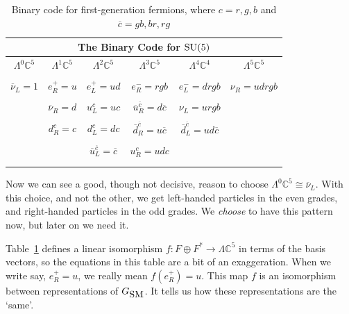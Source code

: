 \documentclass[12pt]{article}
\newcommand{\maps}{\colon}    %
\newcommand{\C}{{\mathbb C}}  %
\newcommand{\SU}{{\rm SU}}    %
\newcommand{\Ex}{\Lambda} %
\newcommand{\iso}{\cong} %
\newcommand{\GSM}{{G_{\mbox{\rm SM}}}}  %
\newcommand{\ubar}{\overline{u}} %
\newcommand{\dbar}{\overline{d}} %
\newcommand{\nubar}{\overline{\nu}} %
\newcommand{\cbar}{{\overline{c}}} %
\begin{document}
	\begin{table}[H]
\begin{center} 
	\begin{tabular}{cccccc} 
		\hline
		\multicolumn{6}{|c|}{\bf{The Binary Code for \boldmath $\SU(5)$}} \\
		\hline
		$\Ex^0 \C^5$   & $\Ex^1 \C^5$    & $\Ex^2 \C^5$            & $\Ex^3 \C^5$             & $\Ex^4 \C^4$              & $\Ex^5 \C^5$ \\ 
		\hline
\\
		$\nubar_L = 1$ & $e^+_R = u$     & $e^+_L = ud$            & $e^-_R = rgb$            & $e^-_L = drgb$            & $\nu_R = udrgb$ \\  \\
		               & $\nubar_R = d$  & $u^c_L = uc$            & $\ubar^\cbar_R = d\cbar$ & $\nu_L = urgb$            & \\  \\
			       & $d^c_R = c$     & $d^c_L = dc$            & $\dbar^\cbar_R = u\cbar$ & $\dbar^\cbar_L = ud\cbar$ & \\   \\
			       &                 & $\ubar^\cbar_L = \cbar$ & $u^c_R = udc$            &                           & \\   \\
		\hline
	\vspace{-10pt}
	\end{tabular}
		\caption{Binary code for first-generation fermions, where
      $c= r, g, b$ and $\cbar = gb, br, rg$} \label{tab:su5code}
\end{center}
\end{table}
\vspace{-1em}

Now we can see a good, though not decisive, reason to choose $\Ex^0 \C^5 \iso
\nubar_L$. With this choice, and not the other, we get left-handed particles in
the even grades, and right-handed particles in the odd grades. We \emph{choose}
to have this pattern now, but later on we need it.

Table~\ref{tab:su5code} defines a linear isomorphism $f \maps F \oplus F^* \to
\Ex \C^5$ in terms of the basis vectors, so the equations in this table
are a bit of an exaggeration.  When we write say, $e^+_R = u$, we really
mean $f(e^+_R) = u$.  This map $f$ is an isomorphism between 
representations of $\GSM$. It tells us how these representations are 
the `same'.
\end{document}
